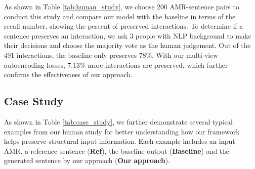 \documentclass[11pt,a4paper]{article}
\begin{document}
As shown in Table \ref{tab:human_study}, we choose 200 AMR-sentence pairs to conduct this study and compare our model with the baseline in terms of the recall number, showing the percent of preserved interactions.
To determine if a sentence preserves an interaction, we ask 3 people with NLP background to make their decisions and choose the majority vote as the human judgement.
Out of the 491 interactions, the baseline only preserves 78\%.
With our multi-view autoencoding losses, 7.13\% more interactions are preserved, which further confirms the effectiveness of our approach.


\subsection{Case Study}


As shown in Table \ref{tab:case_study}, we further demonstrate several typical examples from our human study for better understanding how our framework helps preserve structural input information.
Each example includes an input AMR, a reference sentence (\textbf{Ref}), the baseline output (\textbf{Baseline}) and the generated sentence by our approach (\textbf{Our approach}).
\end{document}
